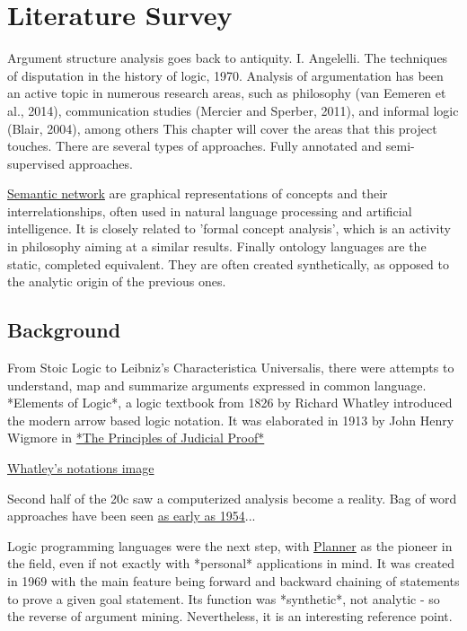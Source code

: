 \documentclass{article}
\begin{document}
\newpage

\chapter{Literature Survey}
Argument structure analysis goes back to antiquity. I. Angelelli. The techniques of disputation in the history of logic, 1970.
Analysis of argumentation has been an active topic in numerous research areas, such as philosophy (van Eemeren et al., 2014), communication studies (Mercier and Sperber, 2011), and informal logic (Blair, 2004), among others This chapter will cover the areas that this project touches. There are several types of approaches. Fully annotated and semi-supervised approaches.

\href{https://en.wikipedia.org/wiki/Semantic_network}{Semantic network} are graphical representations of concepts and their interrelationships, often used in natural language processing and artificial intelligence. It is closely related to 'formal concept analysis', which is an activity in philosophy aiming at a similar results. Finally ontology languages are the static, completed equivalent. They are often created synthetically, as opposed to the analytic origin of the previous ones.

\section{Background}
From Stoic Logic to Leibniz's Characteristica Universalis, there were attempts to understand, map and summarize arguments expressed in common language. 
*Elements of Logic*, a logic textbook from 1826 by Richard Whatley introduced the modern arrow based logic notation. It was elaborated in 1913 by John Henry Wigmore in \href{https://archive.org/details/principlesjudic00wigmgoog}{*The Principles of Judicial Proof*}

\href{https://commons.wikimedia.org/wiki/File:Whatley.png}{Whatley's notations image}

Second half of the 20c saw a computerized analysis become a reality. Bag of word approaches have been seen \href{https://www.tandfonline.com/doi/abs/10.1080/00437956.1954.11659520}{as early as 1954}...

Logic programming languages were the next step, with \href{https://en.wikipedia.org/wiki/Planner_(programming_language)}{Planner} as the pioneer in the field, even if not exactly with *personal* applications in mind.  It was created in 1969 with the main feature being forward and backward chaining of statements to prove a given goal statement.
Its function was *synthetic*, not analytic - so the reverse of argument mining. Nevertheless, it is an interesting reference point.
\end{document}
